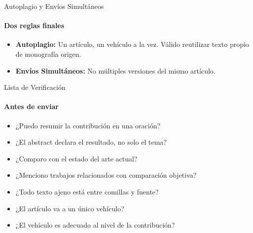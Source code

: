 \documentclass[aspectratio=169, 12pt]{beamer}
\begin{document}
\begin{frame}{Autoplagio y Envíos Simultáneos}
  \framesubtitle{Dos reglas finales}
  \vspace{-2pt}

  \begin{itemize}
    \item {\bfseries Autoplagio:} Un artículo, un vehículo a la vez. Válido reutilizar texto propio de monografía origen.
    \item {\bfseries Envíos Simultáneos:} No múltiples versiones del mismo artículo.
  \end{itemize}
\end{frame}

\begin{frame}{Lista de Verificación}
  \framesubtitle{Antes de enviar}
  \vspace{-2pt}

  \begin{itemize}
    \item ¿Puedo resumir la contribución en una oración?
    \item ¿El abstract declara el resultado, no solo el tema?
    \item ¿Comparo con el estado del arte actual?
    \item ¿Menciono trabajos relacionados con comparación objetiva?
    \item ¿Todo texto ajeno está entre comillas y fuente?
    \item ¿El artículo va a un único vehículo?
    \item ¿El vehículo es adecuado al nivel de la contribución?
  \end{itemize}
\end{frame}
\end{document}
